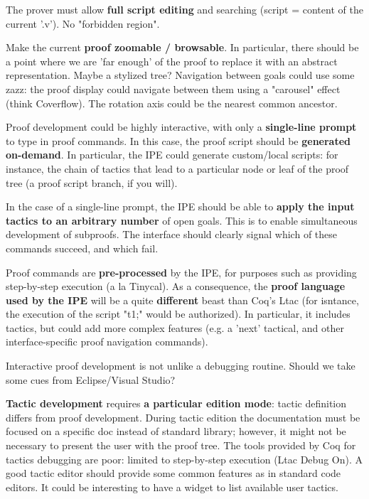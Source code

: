 \documentclass[11pt,a4paper]{article}
\begin{document}
The prover must allow {\bf full script editing} and searching (script =
content of the current '.v'). No "forbidden region".

Make the current {\bf proof zoomable / browsable}. In particular, there
should be a point where we are 'far enough' of the proof to replace it
with an abstract representation. Maybe a stylized tree? Navigation
between goals could use some zazz: the proof display could navigate
between them using a "carousel" effect (think Coverflow). The rotation
axis could be the nearest common ancestor.


Proof development could be highly interactive, with only a {\bf single-line
prompt} to type in proof commands. In this case, the proof script
should be {\bf generated on-demand}. In particular, the IPE could generate
custom/local scripts: for instance, the chain of tactics that lead to
a particular node or leaf of the proof tree (a proof script branch, if
you will).


In the case of a single-line prompt, the IPE should be able to {\bf apply
the input tactics to an arbitrary number} of open goals. This is to
enable simultaneous development of subproofs. The interface should
clearly signal which of these commands succeed, and which fail.


Proof commands are {\bf pre-processed} by the IPE, for purposes such as
providing step-by-step execution (a la Tinycal). As a consequence, the
{\bf proof language used by the IPE} will be a quite {\bf different} beast than
Coq's Ltac (for isntance, the execution of the script "t1;" would be
authorized). In particular, it includes tactics, but could add more
complex features (e.g. a 'next' tactical, and other interface-specific
proof navigation commands).

Interactive proof development is not unlike a debugging
routine. Should we take some cues from Eclipse/Visual Studio?


{\bf Tactic development} requires {\bf a particular edition mode}: tactic
definition differs from proof development. During tactic edition the
documentation must be focused on a specific doc instead of standard
library; however, it might not be necessary to present the user with
the proof tree. The tools provided by Coq for tactics debugging are
poor: limited to step-by-step execution (Ltac Debug On). A good tactic
editor should provide some common features as in standard code
editors. It could be interesting to have a widget to list available
user tactics.

\noindent{\large[/SCRATCHPAD]}
\end{document}
